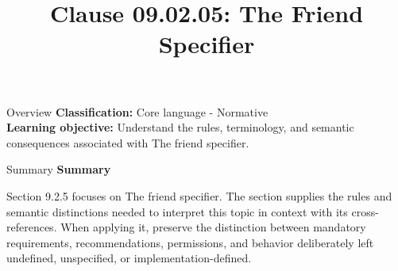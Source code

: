 \documentclass[10pt,letterpaper]{article}
\title{Clause 09.02.05: The Friend Specifier}
\author{}
\date{}
\begin{document}
\maketitle
\begin{CornellOverviewBox}{Overview}
\textbf{Classification:} Core language - Normative\\[2pt]
\textbf{Learning objective:} Understand the rules, terminology, and semantic consequences associated with The friend specifier.
\end{CornellOverviewBox}\begin{CornellSummaryBox}{Summary}
{\sffamily\bfseries\color{Accent} Summary}\par\vspace{3pt}Section 9.2.5 focuses on The friend specifier. The section supplies the rules and semantic distinctions needed to interpret this topic in context with its cross-references. When applying it, preserve the distinction between mandatory requirements, recommendations, permissions, and behavior deliberately left undefined, unspecified, or implementation-defined.
\end{CornellSummaryBox}
\end{document}

